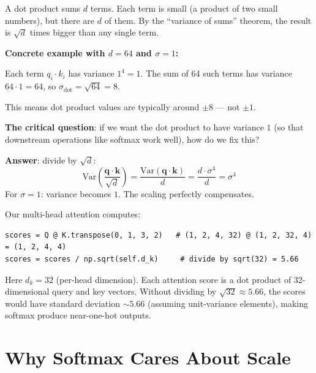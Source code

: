 \documentclass[11pt, a4paper]{article}
\begin{document}
\begin{intuition}
A dot product sums $d$ terms. Each term is small (a product of two small numbers), but there
are $d$ of them. By the ``variance of sums'' theorem, the result is $\sqrt{d}$ times bigger
than any single term.

\medskip
\noindent \textbf{Concrete example with $d = 64$ and $\sigma = 1$:}

Each term $q_i \cdot k_i$ has variance $1^4 = 1$.
The sum of 64 such terms has variance $64 \cdot 1 = 64$, so $\sigma_\text{dot} = \sqrt{64} = 8$.

This means dot product values are typically around $\pm 8$ --- not $\pm 1$.

\medskip
\noindent \textbf{The critical question}: if we want the dot product to have variance $1$
(so that downstream operations like softmax work well), how do we fix this?

\medskip
\noindent \textbf{Answer}: divide by $\sqrt{d}$:
\[
\text{Var}\!\left(\frac{\bm{q} \cdot \bm{k}}{\sqrt{d}}\right) = \frac{\text{Var}(\bm{q} \cdot \bm{k})}{d} = \frac{d \cdot \sigma^4}{d} = \sigma^4
\]
For $\sigma = 1$: variance becomes $1$. The scaling perfectly compensates.
\end{intuition}

\begin{application}
Our multi-head attention computes:
\begin{verbatim}
scores = Q @ K.transpose(0, 1, 3, 2)   # (1, 2, 4, 32) @ (1, 2, 32, 4) = (1, 2, 4, 4)
scores = scores / np.sqrt(self.d_k)     # divide by sqrt(32) = 5.66
\end{verbatim}

\noindent Here $d_k = 32$ (per-head dimension). Each attention score is a dot product of
32-dimensional query and key vectors. Without dividing by $\sqrt{32} \approx 5.66$, the scores
would have standard deviation $\sim 5.66$ (assuming unit-variance elements), making softmax
produce near-one-hot outputs.
\end{application}


\section{Why Softmax Cares About Scale}
\end{document}

